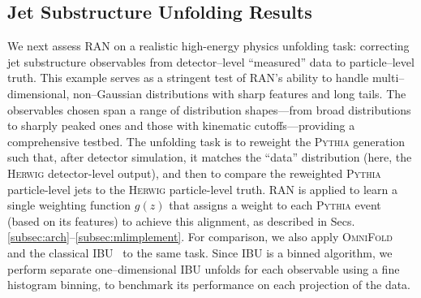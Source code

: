 {{    \subsection{Jet Substructure Unfolding Results}
        We next assess RAN on a realistic high-energy physics unfolding task: correcting jet substructure observables from detector--level “measured” data to particle--level truth.
        This example serves as a stringent test of RAN’s ability to handle multi--dimensional, non--Gaussian distributions with sharp features and long tails.
        The observables chosen span a range of distribution shapes---from broad distributions to sharply peaked ones and those with kinematic cutoffs---providing a comprehensive testbed.
        The unfolding task is to reweight the \textsc{Pythia} generation such that, after detector simulation, it matches the “data” distribution (here, the \textsc{Herwig} detector-level output), and then to compare the reweighted \textsc{Pythia} particle-level jets to the \textsc{Herwig} particle-level truth.
        RAN is applied to learn a single weighting function $g(z)$ that assigns a weight to each \textsc{Pythia} event (based on its features) to achieve this alignment, as described in Secs.\ref{subsec:arch}–\ref{subsec:mlimplement}.
        For comparison, we also apply \textsc{OmniFold}~ and the classical IBU~ to the same task.
        Since IBU is a binned algorithm, we perform separate one--dimensional IBU unfolds for each observable using a fine histogram binning, to benchmark its performance on each projection of the data.

}}
